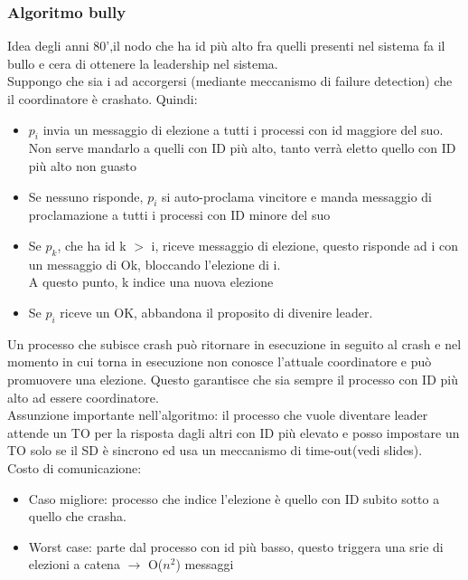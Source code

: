\documentclass{article}
\begin{document}
\subsubsection{Algoritmo bully}
Idea degli anni 80',il nodo che ha id più alto fra quelli presenti nel sistema fa il bullo e cera di ottenere la leadership nel sistema.\\ Suppongo che sia i ad accorgersi (mediante meccanismo di failure detection) che il coordinatore è crashato. Quindi:
\begin{itemize}
\item $p_i$ invia un messaggio di elezione a tutti i processi con id maggiore del suo. Non serve mandarlo a quelli con ID più alto, tanto verrà eletto quello con ID più alto non guasto
\item Se nessuno risponde, $p_i$ si auto-proclama vincitore e manda messaggio di proclamazione a tutti i processi con ID minore del suo
\item Se $p_k$, che ha id k $>$ i, riceve messaggio di elezione, questo risponde ad i con un messaggio di Ok, bloccando l'elezione di i.\\ A questo punto, k indice una nuova elezione
\item Se $p_i$ riceve un OK, abbandona il proposito di divenire leader.
\end{itemize}
Un processo che subisce crash può ritornare in esecuzione in seguito al crash e nel momento in cui torna in esecuzione non conosce l'attuale coordinatore e può promuovere una elezione. Questo garantisce che sia sempre il processo con ID più alto ad essere coordinatore.\\ Assunzione importante nell'algoritmo: il processo che vuole diventare leader attende un TO per la risposta dagli altri con ID più elevato e posso impostare un TO solo se il SD è sincrono ed usa un meccanismo di time-out(vedi slides).\\ Costo di comunicazione:
\begin{itemize}
\item Caso migliore: processo che indice l'elezione è quello con ID subito sotto a quello che crasha.
\item Worst case: parte dal processo con id più basso, questo triggera una srie di elezioni a catena $\rightarrow$ O($n^2$) messaggi
\end{itemize}
\end{document}

